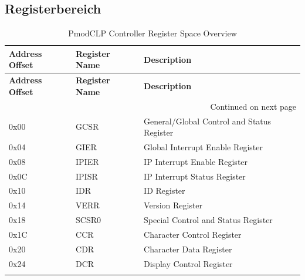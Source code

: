 \subsection{Registerbereich}
\begin{longtable}{|p{3cm}|p{3cm}|p{8cm}|}
    \hline
    \textbf{Address Offset} & \textbf{Register Name} & \textbf{Description} \\
    \hline
    \endfirsthead
    \hline
    \textbf{Address Offset} & \textbf{Register Name} & \textbf{Description} \\
    \hline
    \endhead
    \hline \multicolumn{3}{|r|}{{Continued on next page}} \\ \hline
    \endfoot
    \hline
    \endlastfoot

    0x00 & GCSR & General/Global Control and Status Register \\
    \hline
    0x04 & GIER & Global Interrupt Enable Register \\
    \hline
    0x08 & IPIER & IP Interrupt Enable Register \\
    \hline
    0x0C & IPISR & IP Interrupt Status Register \\
    \hline
    0x10 & IDR & ID Register \\
    \hline
    0x14 & VERR & Version Register \\
    \hline
    0x18 & SCSR0 & Special Control and Status Register \\
    \hline
    0x1C & CCR & Character Control Register \\
    \hline
    0x20 & CDR & Character Data Register \\
    \hline
    0x24 & DCR & Display Control Register \\
    \hline
    \caption{PmodCLP Controller Register Space Overview}
    \label{tab:register_overview}
    \end{longtable}

